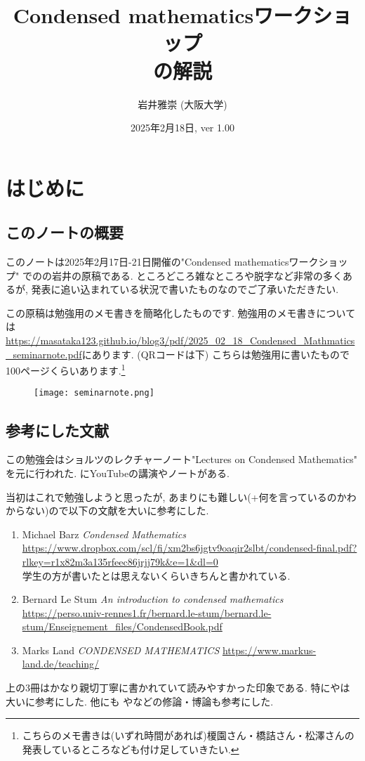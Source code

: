 \documentclass[dvipdfmx,a4paper,11pt]{article}
\title{Condensed mathematicsワークショップ \\ \cite[Section 2.A Appendix]{Sch19}の解説}
\author{岩井雅崇 (大阪大学)}
\date{2025年2月18日, ver 1.00}
\theoremstyle{definition}
\begin{document}
\maketitle
\tableofcontents

\newpage

\setcounter{section}{-1}
\section{はじめに}

\subsection{このノートの概要}
このノートは2025年2月17日-21日開催の"Condensed mathematicsワークショップ"
での\cite[Section 2.A Appendix]{Sch19}の岩井の原稿である.
ところどころ雑なところや脱字など非常の多くあるが, 発表に追い込まれている状況で書いたものなのでご了承いただきたい. 

この原稿は勉強用のメモ書きを簡略化したものです. 勉強用のメモ書きについては\url{https://masataka123.github.io/blog3/pdf/2025_02_18_Condensed_Mathmatics_seminarnote.pdf}にあります. (QRコードは下)
こちらは勉強用に書いたもので100ページくらいあります.\footnote{こちらのメモ書きは(いずれ時間があれば)榎園さん・橋詰さん・松澤さんの発表しているところなども付け足していきたい.}
\begin{figure}[htbp]
\begin{center}
 \texttt{[image: seminarnote.png]}
\end{center}
\end{figure}

\subsection{参考にした文献}
この勉強会はショルツのレクチャーノート"Lectures on Condensed Mathematics"\cite{Sch19}
を元に行われた. \cite{SchClau}にYouTubeの講演やノートがある.

当初はこれで勉強しようと思ったが, あまりにも難しい(+何を言っているのかわからない)ので以下の文献を大いに参考にした.
\begin{enumerate}
\item \cite{Bar22}
Michael Barz \textit{Condensed Mathematics} \\
\url{https://www.dropbox.com/scl/fi/xm2bs6jgtv9oaqir2slbt/condensed-final.pdf?rlkey=r1x82m3a135rfeec86jrjj79k&e=1&dl=0} \\
学生の方が書いたとは思えないくらいきちんと書かれている.
\item \cite{Stum} Bernard Le Stum
\textit{An introduction to condensed mathematics}
\url{https://perso.univ-rennes1.fr/bernard.le-stum/bernard.le-stum/Enseignement_files/CondensedBook.pdf} 
\item \cite{Land} Marks Land \textit{CONDENSED MATHEMATICS}
\url{https://www.markus-land.de/teaching/}
\end{enumerate}
上の3冊はかなり親切丁寧に書かれていて読みやすかった印象である. 特に\cite{Stum}や\cite{Bar22}は大いに参考にした. 他にも\cite{Asg} や\cite{Lep}などの修論・博論も参考にした. 
\end{document}
